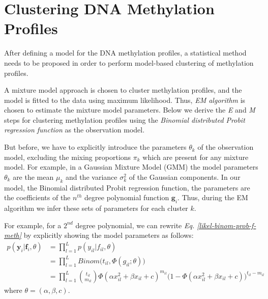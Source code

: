 \section{Clustering DNA Methylation Profiles} \label{cluster-meth-s}
After defining a model for the DNA methylation profiles, a statistical method needs to be proposed in order to perform model-based clustering of methylation profiles. 

A mixture model approach \citep{McLachlan1988} is chosen to cluster methylation profiles, and the model is fitted to the data using maximum likelihood. Thus, \emph{EM algorithm} \citep{Dempster1977} is chosen to estimate the mixture model parameters. Below we derive the \emph{E} and \emph{M} steps for clustering methylation profiles using the \emph{Binomial distributed Probit regression function} as the observation model. 

But before, we have to explicitly introduce the parameters $\theta_{k}$ of the observation model, excluding the mixing proportions $\pi_{k}$ which are present for any mixture model. For example, in a Gaussian Mixture Model (GMM) the model parameters $\theta_{k}$ are the mean $\mu_{k}$ and the variance $\sigma_{k}^{2}$ of the Gaussian components. In our model, the Binomial distributed Probit regression function, the parameters are the coefficients of the $n^{th}$ degree polynomial function $\mathbf{g}_{i}$. Thus, during the EM algorithm we infer these sets of parameters for each cluster $k$. 

For example, for a $2^{nd}$ degree polynomial, we can rewrite \emph{Eq. \ref{likel-binom-prob-f-meth}} by explicitly showing the model parameters as follows:
\begin{equation} \label{likel-binom-prob-example1-f-meth}
  \begin{split}
	p(\mathbf{y}_{i}|\mathbf{f}_{i}, \theta) & = \prod_{l=1}^{L} p(y_{il}|f_{il}, \theta) \\
							 & = \prod_{l=1}^{L} Binom \big(t_{il}, \Phi(g_{il}; \theta)\big) \\
							 & = \prod_{l=1}^{L} \binom{t_{il}}{m_{il}} \Phi(\alpha x_{il}^{2} + \beta x_{il} + c)^{m_{il}} (1 - \Phi(\alpha x_{il}^{2} + \beta x_{il} + c)\big)^{t_{il} - m_{il}}
  \end{split}
\end{equation}
where $\theta = (\alpha, \beta, c)$.

